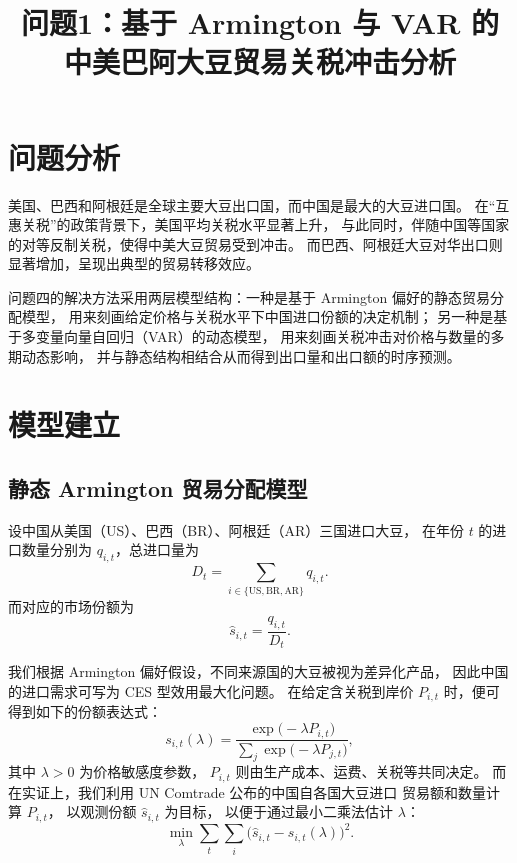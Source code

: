 \documentclass[12pt,a4paper]{ctexart} %
\title{问题1：基于 Armington 与 VAR 的中美巴阿大豆贸易关税冲击分析}
\begin{document}
\maketitle

\section{问题分析}

美国、巴西和阿根廷是全球主要大豆出口国，而中国是最大的大豆进口国。
在“互惠关税”的政策背景下，美国平均关税水平显著上升，
与此同时，伴随中国等国家的对等反制关税，使得中美大豆贸易受到冲击。
而巴西、阿根廷大豆对华出口则显著增加，呈现出典型的贸易转移效应。

问题四的解决方法采用两层模型结构：一种是基于 Armington 偏好的静态贸易分配模型，
用来刻画给定价格与关税水平下中国进口份额的决定机制；
另一种是基于多变量向量自回归（VAR）的动态模型，
用来刻画关税冲击对价格与数量的多期动态影响，
并与静态结构相结合从而得到出口量和出口额的时序预测。

\section{模型建立}

\subsection{静态 Armington 贸易分配模型}

设中国从美国（US）、巴西（BR）、阿根廷（AR）三国进口大豆，
在年份 $t$ 的进口数量分别为 $q_{i,t}$，总进口量为
\begin{equation}
  D_t = \sum_{i \in \{\mathrm{US,BR,AR}\}} q_{i,t}.
\end{equation}
而对应的市场份额为
\begin{equation}
  \hat{s}_{i,t} = \frac{q_{i,t}}{D_t}.
\end{equation}

我们根据 Armington 偏好假设，不同来源国的大豆被视为差异化产品，
因此中国的进口需求可写为 CES 型效用最大化问题。
在给定含关税到岸价 $P_{i,t}$ 时，便可得到如下的份额表达式：
\begin{equation}
  s_{i,t}(\lambda)
  = \frac{\exp\big(-\lambda P_{i,t}\big)}
         {\sum_{j} \exp\big(-\lambda P_{j,t}\big)},
  \label{eq:armington_share}
\end{equation}
其中 $\lambda>0$ 为价格敏感度参数，
$P_{i,t}$ 则由生产成本、运费、关税等共同决定。
而在实证上，我们利用 UN Comtrade 公布的中国自各国大豆进口
贸易额和数量计算 $P_{i,t}$，
以观测份额 $\hat{s}_{i,t}$ 为目标，
以便于通过最小二乘法估计 $\lambda$：
\begin{equation}
  \min_{\lambda}
  \sum_t \sum_i 
  \big( \hat{s}_{i,t} - s_{i,t}(\lambda) \big)^2 .
  \label{eq:lambda_est}
\end{equation}
\end{document}
